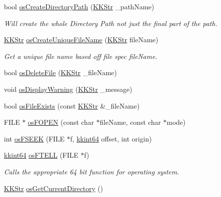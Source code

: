 \begin{DoxyCompactItemize}
\item 
bool \hyperlink{namespace_k_k_b_a61e3d69fe8599d1057ace0d00c38a6f9}{os\+Create\+Directory\+Path} (\hyperlink{class_k_k_b_1_1_k_k_str}{K\+K\+Str} \+\_\+path\+Name)
\begin{DoxyCompactList}\small\item\em Will create the whole Directory Path not just the final part of the path. \end{DoxyCompactList}\item 
\hyperlink{class_k_k_b_1_1_k_k_str}{K\+K\+Str} \hyperlink{namespace_k_k_b_a08b989499c0f3d739953ae032c2f312d}{os\+Create\+Unique\+File\+Name} (\hyperlink{class_k_k_b_1_1_k_k_str}{K\+K\+Str} file\+Name)
\begin{DoxyCompactList}\small\item\em Get a unique file name based off file spec \textquotesingle{}file\+Name\textquotesingle{}. \end{DoxyCompactList}\item 
bool \hyperlink{namespace_k_k_b_a8ff1520db9e1af7f725bd711edca9024}{os\+Delete\+File} (\hyperlink{class_k_k_b_1_1_k_k_str}{K\+K\+Str} \+\_\+file\+Name)
\item 
void \hyperlink{namespace_k_k_b_acf68123327314e60e8213d162c80883f}{os\+Display\+Warning} (\hyperlink{class_k_k_b_1_1_k_k_str}{K\+K\+Str} \+\_\+message)
\item 
bool \hyperlink{namespace_k_k_b_aba5c7fcb492dea01f2115c492ff65d83}{os\+File\+Exists} (const \hyperlink{class_k_k_b_1_1_k_k_str}{K\+K\+Str} \&\+\_\+file\+Name)
\item 
F\+I\+LE $\ast$ \hyperlink{namespace_k_k_b_abf4050d2916ded8349dafadc80f0ecd1}{os\+F\+O\+P\+EN} (const char $\ast$file\+Name, const char $\ast$mode)
\item 
int \hyperlink{namespace_k_k_b_a35eb0ca9cb253fcc536713ce903ed671}{os\+F\+S\+E\+EK} (F\+I\+LE $\ast$f, \hyperlink{namespace_k_k_b_aa3486b1c5ea9162b3b020c69f72826eb}{kkint64} offset, int origin)
\item 
\hyperlink{namespace_k_k_b_aa3486b1c5ea9162b3b020c69f72826eb}{kkint64} \hyperlink{namespace_k_k_b_a2cc11a5ae09d10d69ad751b549e5d94e}{os\+F\+T\+E\+LL} (F\+I\+LE $\ast$f)
\begin{DoxyCompactList}\small\item\em Calls the appropriate 64 bit function for operating system. \end{DoxyCompactList}\item 
\hyperlink{class_k_k_b_1_1_k_k_str}{K\+K\+Str} \hyperlink{namespace_k_k_b_aed20261d2361f9db946aed1c1a1a18ac}{os\+Get\+Current\+Directory} ()

\end{DoxyCompactItemize}
